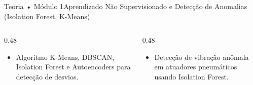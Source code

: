 \begin{senaiframe}{Teoria • Módulo 1}{Aprendizado Não Supervisionado e Detecção de Anomalias (Isolation Forest, K-Means)}
  \begin{columns}[t]
    \begin{column}{0.48\textwidth}
      \begin{tcolorbox}[senaibluecard, title={Fundamentos Teóricos}]
        \begin{itemize}
          \item Algoritmo K-Means, DBSCAN, Isolation Forest e Autoencoders para detecção de desvios.
        \end{itemize}
      \end{tcolorbox}
    \end{column}
    \begin{column}{0.48\textwidth}
      \begin{tcolorbox}[senaigreencard, title={Prática \& Laboratório}]
        \begin{itemize}
          \item Detecção de vibração anômala em atuadores pneumáticos usando Isolation Forest.
        \end{itemize}
      \end{tcolorbox}
    \end{column}
  \end{columns}
\end{senaiframe}
